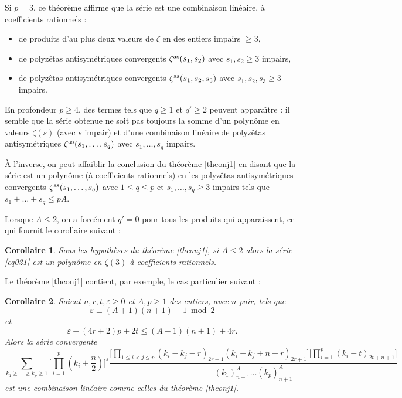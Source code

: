 \documentclass[12pt,francais, reqno]{smfart}
\numberwithin{equation}{section}
\newcommand{\eps}{\varepsilon}
\newcommand{\zetaantisym}{\zeta^{{\rm as}}}
\newtheorem{Cor}{Corollaire}
\begin{document}
Si $p=3$, ce th\'eor\`eme affirme que la s\'erie est une combinaison lin\'eaire, \`a coefficients rationnels :
 \begin{itemize}
 \item de produits d'au plus deux valeurs  de $\zeta$ en des entiers impairs $\geq 3$, 
 \item de polyz\^etas antisym\'etriques convergents $\zetaantisym (s_1, s_2)$ avec $s_1, s_2 \geq 3$ impairs, 
 \item de polyz\^etas antisym\'etriques convergents $\zetaantisym (s_1, s_2, s_3)$ avec $s_1, s_2, s_3 \geq 3$ impairs. 
 \end{itemize} 

En profondeur $p \geq 4$, des termes tels que $q \geq 1$ et $q' \geq 2$ peuvent appara\^{\i}tre : 
il semble que la s\'erie obtenue ne soit pas toujours la somme d'un polyn\^ome en valeurs  $\zeta(s)$ 
(avec $s $ impair) et d'une combinaison lin\'eaire de polyz\^etas antisym\'etriques $\zetaantisym 
(s_1, \ldots, s_q)$ avec $s_1, \ldots, s_q $ impairs. 

\`A l'inverse, on peut affaiblir la conclusion du th\'eor\`eme \ref{thconj1} en disant que la
 s\'erie est un polyn\^ome (\`a coefficients rationnels) en les polyz\^etas antisym\'etriques 
convergents $\zetaantisym (s_1, \ldots, s_q)$ avec $1 \leq q \leq p$ et $s_1, \ldots , s_q \geq 3$ 
impairs tels que $s_1 +\ldots + s_q \leq pA$. 


\bigskip

Lorsque $A \leq 2$,  on a forc\'ement $q'=0$ pour tous les produits qui apparaissent, ce qui fournit le corollaire suivant :

\begin{Cor} 
Sous les hypoth\`eses du th\'eor\`eme \ref{thconj1}, si $A \leq 2$ alors la s\'erie \eqref{eq021} est 
 un polyn\^ome en $\zeta(3)$ \`a coefficients rationnels. 
\end{Cor}

\bigskip

Le th\'eor\`eme \ref{thconj1} contient, par exemple, le cas particulier suivant : 


\begin{Cor} \label{corconj1}
Soient $n, r, t, \eps \geq 0$ et $A,p \geq 1$ des entiers, avec $n$ pair,  tels que
$$\eps  \equiv (A+1)(n+1) +1  \bmod 2$$
et
$$\eps + (4r+2)p + 2t \leq (A-1)(n+1) + 4r.$$
Alors la s\'erie convergente
\begin{equation}\label{eq:seriecorollaire}
\sum_{k_1 \geq \ldots \geq  k_p \geq 1}
\bigg[\prod_{i=1} ^p (k_i + \frac{n}{2})\bigg]^{\eps} 
 \frac{ \displaystyle  \bigg[ \prod_{1 \leq i < j \leq p}  (k_i-k_j-r)_{2r+1} (k_i+k_j+n-r)_{2r+1} \bigg] 
 \bigg[ \prod_{i=1} ^p (k_i-t)_{2t+n+1}   \bigg]  }{(k_1)_{n+1}^{A} \ldots  (k_p)_{n+1}^{A} }
\end{equation}
est une combinaison lin\'eaire comme celles du th\'eor\`eme \ref{thconj1}. 
\end{Cor}
\end{document}
